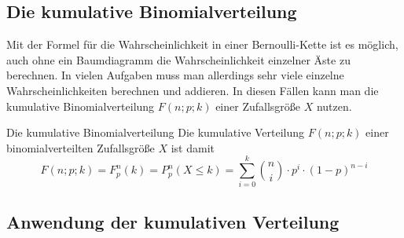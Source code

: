 \subsection{Die kumulative Binomialverteilung}
Mit der Formel für die Wahrscheinlichkeit in einer Bernoulli-Kette ist es möglich, auch ohne ein Baumdiagramm die Wahrscheinlichkeit einzelner Äste zu berechnen. In vielen Aufgaben muss man allerdings sehr viele einzelne Wahrscheinlichkeiten berechnen und addieren. In diesen Fällen kann man die kumulative Binomialverteilung \(F(n;p;k)\) einer Zufallsgröße \(X\) nutzen.
\begin{satz}{Die kumulative Binomialverteilung}{}
Die kumulative Verteilung \(F(n;p;k)\) einer binomialverteilten Zufallsgröße \(X\) ist damit\[F(n;p;k) = F^n_p(k) = P^n_p(X\leq k) = \sum\limits_{i=0}^k \binom{n}{i} \cdot p^{i}\cdot (1-p)^{n-i}\]
\end{satz}

\subsection{Anwendung der kumulativen Verteilung}

